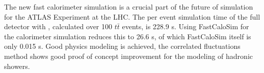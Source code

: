 The new fast calorimeter simulation is a crucial part of the future of simulation for the ATLAS Experiment at the LHC. 
The per event simulation time of the full detector with \GEANT, calculated over 100 $t\bar{t}$ events, is 228.9 s. 
Using FastCaloSim for the calorimeter simulation reduces this to 26.6 s, of which FastCaloSim itself is only 0.015 s. 
Good physics modeling is achieved, the correlated fluctuations method shows good proof of concept improvement for 
the modeling of hadronic showers.

